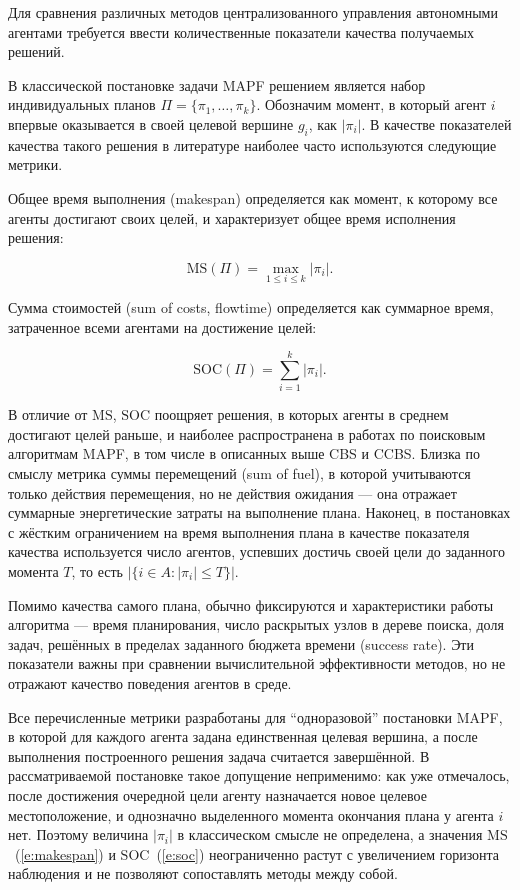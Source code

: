 Для сравнения различных методов централизованного управления автономными агентами требуется ввести 
количественные показатели качества получаемых решений.

В классической постановке задачи MAPF решением является набор индивидуальных планов 
$\Pi = \{\pi_1, \ldots, \pi_k\}$. Обозначим момент, в который агент $i$ впервые оказывается в своей 
целевой вершине $g_i$, как $|\pi_i|$. В качестве показателей качества такого решения в литературе 
\cite{mapf-definition} наиболее часто используются следующие метрики.

Общее время выполнения (makespan) определяется как момент, к которому все агенты достигают своих целей, 
и характеризует общее время исполнения решения:

\begin{equation}
    \mathrm{MS}(\Pi) = \max_{1 \leq i \leq k} |\pi_i|.
\label{e:makespan}
\end{equation}

Сумма стоимостей (sum of costs, flowtime) определяется как суммарное время, затраченное всеми агентами 
на достижение целей:

\begin{equation}
    \mathrm{SOC}(\Pi) = \sum_{i = 1}^{k} |\pi_i|.
\label{e:soc}
\end{equation}

В отличие от $\mathrm{MS}$, $\mathrm{SOC}$ поощряет решения, в которых агенты в среднем достигают
целей раньше, и наиболее распространена в работах по поисковым алгоритмам MAPF, в том числе в
описанных выше CBS и CCBS. Близка по смыслу метрика суммы перемещений (sum of fuel), в
которой учитываются только действия перемещения, но не действия ожидания --- она отражает суммарные
энергетические затраты на выполнение плана. Наконец, в постановках с жёстким ограничением на
время выполнения плана в качестве показателя качества используется число агентов, успевших достичь
своей цели до заданного момента $T$, то есть $|\{i \in A : |\pi_i| \leq T\}|$.

Помимо качества самого плана, обычно фиксируются и характеристики работы алгоритма --- время планирования, 
число раскрытых узлов в дереве поиска, доля задач, решённых в пределах заданного бюджета времени 
(success rate). Эти показатели важны при сравнении вычислительной эффективности методов, но не 
отражают качество поведения агентов в среде.

Все перечисленные метрики разработаны для \enquote{одноразовой} постановки MAPF, в
которой для каждого агента задана единственная целевая вершина, а после выполнения построенного
решения задача считается завершённой. В рассматриваемой постановке такое допущение
неприменимо: как уже отмечалось, после достижения очередной цели агенту назначается новое целевое
местоположение, и однозначно выделенного момента окончания плана у агента $i$ нет. Поэтому
величина $|\pi_i|$ в классическом смысле не определена, а значения $\mathrm{MS}$~(\ref{e:makespan})
и $\mathrm{SOC}$~(\ref{e:soc}) неограниченно растут с увеличением горизонта наблюдения и не
позволяют сопоставлять методы между собой.


